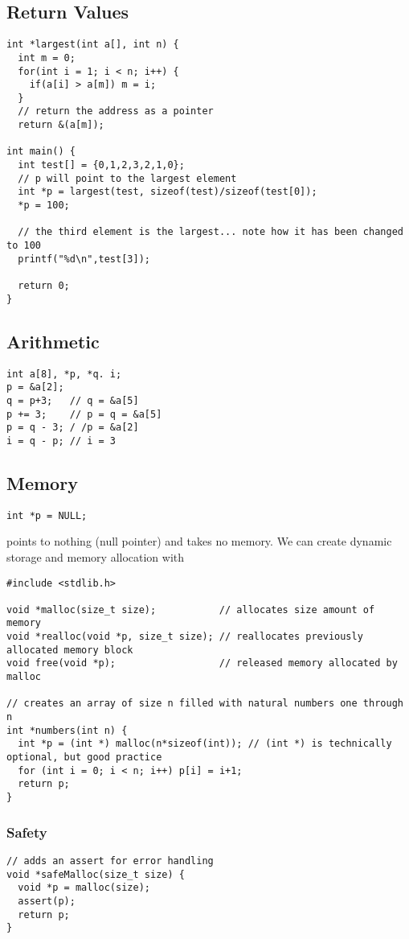 \documentclass[12pt]{article}
\begin{document}
\subsection*{Return Values}
\begin{verbatim}
int *largest(int a[], int n) {
  int m = 0;
  for(int i = 1; i < n; i++) {
    if(a[i] > a[m]) m = i;
  }
  // return the address as a pointer
  return &(a[m]);

int main() {
  int test[] = {0,1,2,3,2,1,0};
  // p will point to the largest element
  int *p = largest(test, sizeof(test)/sizeof(test[0]);
  *p = 100;

  // the third element is the largest... note how it has been changed to 100
  printf("%d\n",test[3]);

  return 0;
}
\end{verbatim}

\subsection*{Arithmetic}
\begin{verbatim}
int a[8], *p, *q. i;
p = &a[2];
q = p+3;   // q = &a[5]
p += 3;    // p = q = &a[5]
p = q - 3; / /p = &a[2]
i = q - p; // i = 3
\end{verbatim}

\subsection*{Memory}
\begin{verbatim}int *p = NULL;\end{verbatim} points to nothing (null pointer) and takes no memory. We can create dynamic storage and memory allocation with
\begin{verbatim}
#include <stdlib.h>

void *malloc(size_t size);           // allocates size amount of memory
void *realloc(void *p, size_t size); // reallocates previously allocated memory block
void free(void *p);                  // released memory allocated by malloc

// creates an array of size n filled with natural numbers one through n
int *numbers(int n) {
  int *p = (int *) malloc(n*sizeof(int)); // (int *) is technically optional, but good practice
  for (int i = 0; i < n; i++) p[i] = i+1;
  return p;
}
\end{verbatim}

\subsubsection*{Safety}
\begin{verbatim}
// adds an assert for error handling
void *safeMalloc(size_t size) {
  void *p = malloc(size);
  assert(p);
  return p;
}
\end{verbatim}
\end{document}
